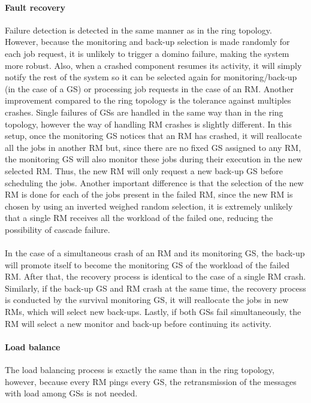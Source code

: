 \paragraph{Fault recovery}
Failure detection is detected in the same manner as in the ring topology. However, because the monitoring and back-up selection is made randomly for each job request, it is unlikely to trigger a domino failure, making the system more robust. Also, when a crashed component resumes its activity, it will simply notify the rest of the system so it can be selected again for monitoring/back-up (in the case of a GS) or processing job requests in the case of an RM. Another improvement compared to the ring topology is the tolerance against multiples crashes. Single failures of GSs are handled in the same way than in the ring topology, however the way of handling RM crashes is slightly different. In this setup, once the monitoring GS notices that an RM has crashed, it will reallocate all the jobs in another RM but, since there are no fixed GS assigned to any RM, the monitoring GS will also monitor these jobs during their execution in the new selected RM. Thus, the new RM will only request a new back-up GS before scheduling the jobs. Another important difference is that the selection of the new RM is done for each of the jobs present in the failed RM, since the new RM is chosen by using an inverted weighed random selection, it is extremely unlikely that a single RM receives all the workload of the failed one, reducing the possibility of cascade failure.
\\\\
In the case of a simultaneous crash of an RM and its monitoring GS, the back-up will promote itself to become the monitoring GS of the workload of the failed RM. After that, the recovery process is identical to the case of a single RM crash. Similarly, if the back-up GS and RM crash at the same time, the recovery process is conducted by the survival monitoring GS, it will reallocate the jobs in new RMs, which will select new back-ups. Lastly, if both GSs fail simultaneously, the RM will select a new monitor and back-up before continuing its activity.

\paragraph{Load balance}
The load balancing process is exactly the same than in the ring topology, however, because every RM pings every GS, the retransmission of the messages with load among GSs is not needed.

